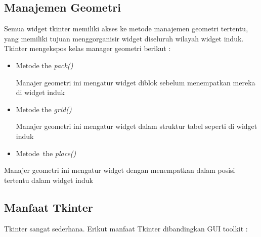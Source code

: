 \vspace{10pt}
\subsection{Manajemen Geometri} 
 
\hspace*{0.5in} Semua widget tkinter memiliki akses ke metode manajemen geometri tertentu, yang memiliki tujuan menggorganisir widget diseluruh wilayah widget induk. Tkinter mengekspos kelas manager geometri berikut : 
 
\begin{itemize}
\item Metode the \textit{pack()} 
 
Manajer geometri ini mengatur widget diblok sebelum menempatkan mereka di widget induk 
\item Metode the \textit{grid()} 
 
Manajer geometri ini mengatur widget dalam struktur tabel seperti di widget induk 
\item Metode~the  \textit{place()}\end{itemize}
  
Manajer geometri ini mengatur widget dengan menempatkan dalam posisi tertentu dalam widget induk 
\vspace{12pt}
 
\subsection{Manfaat Tkinter} 
\hspace*{0.5in} Tkinter sangat sederhana. Erikut manfaat Tkinter dibandingkan GUI toolkit : 
 
